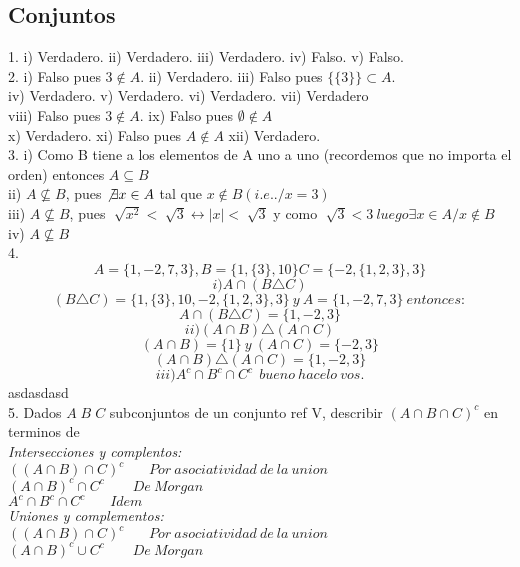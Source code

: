 \documentclass[a4paper,11pt]{article}
\begin{document}
\subsection{Conjuntos}
1. i) Verdadero. ii) Verdadero. iii) Verdadero. iv) Falso. v) Falso.\\
2. i) Falso pues \(3\not\in A\). ii) Verdadero. iii) Falso pues \(\lbrace\lbrace3\rbrace\rbrace\subset A\).\\
 iv) Verdadero. v) Verdadero. vi) Verdadero. vii) Verdadero \\
 viii) Falso pues \(3\notin A\). ix) Falso pues \(\emptyset \not\in A\) \\
 x) Verdadero. xi) Falso pues \(A \not\in A\) xii) Verdadero. \\
3.
i) Como B tiene a los elementos de A uno a uno (recordemos que no importa el orden) entonces \(A \subseteq B\)\\
ii) \(A \not \subseteq B\), pues \(\not\exists x \in A\) tal que \(x \not\in B (i.e. ./x = 3)\)\\
iii) \(A \not \subseteq B\), pues \(\sqrt[]{x^2}<\sqrt[]{3}\leftrightarrow |x|<\sqrt[]{3} \) y como \(\sqrt[]{3}<3 \ luego \exists x\in A / x \not\in B\)\\
iv) \(A \not \subseteq B\)\\
4. \[
A=\{1, -2, 7, 3\} , B=\{1, \{3\}, 10\} C=\{-2, \{1,2,3\}, 3\}
\]
\[i) A \cap (B \triangle C)\]
\[(B \triangle C) = \{1,\{3\}, 10, -2, \{1,2,3\},3\} \:y\: A=\{1, -2, 7, 3\}\:entonces: \]
\[A \cap (B \triangle C) = \{1, -2, 3\}\]
\[ii) (A \cap B) \triangle (A \cap C)\]
\[(A \cap B)=\{1\}\:y\:(A \cap C)=\{-2,3\}\]
\[(A \cap B) \triangle (A \cap C)=\{1,-2,3\}\]
\[iii) A^{c}\cap B^{c}\cap C^{c}\:\:bueno \:hacelo\: vos.\]
asdasdasd\\
5. Dados \(A\;B\;C\) subconjuntos de un conjunto ref V, describir \((A\cap B\cap C)^{c}\) en terminos de\\
\textit{Intersecciones y complentos:}\\
\(((A\cap B)\cap C)^{c}\:\:\:\:\:\:\:\:Por\:asociatividad\: de\: la\: union\)\\
\((A\cap B)^{c}\cap C^{c}\:\:\:\:\:\:\:\:\:De\: Morgan\)\\
\(A^{c}\cap B^{c}\cap C^{c}\:\:\:\:\:\:\:\:Idem\)\\
\textit{Uniones y complementos:}\\
\(((A\cap B)\cap C)^{c}\:\:\:\:\:\:\:\:Por\:asociatividad\: de\: la\: union\)\\
\((A\cap B)^{c}\cup C^{c}\:\:\:\:\:\:\:\:\:De\: Morgan\)\\
\end{document}
